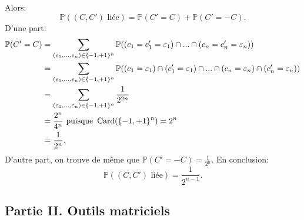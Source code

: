 \begin{enumerate}
\begin{enumerate}
           Alors:
            \[\mathbb{P}((C, C')\text{ liée})  = \mathbb{P}(C' = C) + \mathbb{P}(C' = -C).\]
            D'une part:
            \begin{align}
             \mathbb{P}(C' = C) & = \sum_{(\varepsilon_{1}, ..., \varepsilon_{n})\in \{ -1, +1\}^{n}}\mathbb{P}((c_{1} = c_{1}' = \varepsilon_{1})\cap ... \cap (c_{n} = c_{n}' = \varepsilon_{n}))\notag\\
             & =  \sum_{(\varepsilon_{1}, ..., \varepsilon_{n})\in \{ -1, +1\}^{n}} \mathbb{P}((c_{1} = \varepsilon_{1}) \cap (c_{1}' = \varepsilon_{1}) \cap ... \cap (c_{n} = \varepsilon_{n}) \cap (c_{n}' = \varepsilon_{n}))\notag \\
             & =  \sum_{(\varepsilon_{1}, ..., \varepsilon_{n})\in \{ -1, +1\}^{n}} \frac{1}{2^{2n}}\notag \\
             & = \frac{2^{n}}{4^{n}} \text{ puisque } \operatorname{Card}(\{ -1, +1\}^{n}) = 2^{n} \notag\\
             & = \frac{1}{2^{n}}.\notag
            \end{align}
            D'autre part, on trouve de même que $\mathbb{P}(C' = -C) = \displaystyle{\frac{1}{2^{n}}}$. En conclusion:
            \[ \mathbb{P}((C, C') \text{ liée}) = \frac{1}{2^{n-1}}.\]
          \end{enumerate}
\end{enumerate}
          



\subsection*{Partie II. Outils matriciels}



